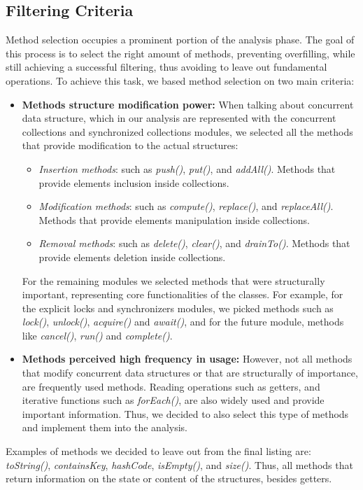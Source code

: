 \documentclass[]{usiinfthesis}
\begin{document}
\subsection{Filtering Criteria}
 Method selection occupies a prominent portion of the analysis phase. The goal of this process is to select the right amount of methods, preventing overfilling, while still achieving a successful filtering, thus avoiding to leave out fundamental operations. To achieve this task, we based method selection on two main criteria:
 \begin{itemize}
    \item \textbf{Methods structure modification power: } When talking about concurrent data structure, which in our analysis are represented with the concurrent collections and synchronized collections modules, we selected all the methods that provide modification to the actual structures:
    \begin{itemize}
        \item \textit{Insertion methods}: such as \textit{push()}, \textit{put()}, and \textit{addAll()}. Methods that provide elements inclusion inside collections.
        \item \textit{Modification methods}: such as \textit{compute()}, \textit{replace()}, and \textit{replaceAll()}. Methods that provide elements manipulation inside collections.
        \item \textit{Removal methods}: such as \textit{delete()}, \textit{clear()}, and \textit{drainTo()}. Methods that provide elements deletion inside collections.
    \end{itemize}
    For the remaining modules we selected methods that were structurally important, representing core functionalities of the classes. For example, for the explicit locks and synchronizers modules, we picked methods such as \textit{lock()}, \textit{unlock()}, \textit{acquire()} and \textit{await()}, and for the future module, methods like \textit{cancel()}, \textit{run()} and \textit{complete()}. 
    
    \item \textbf{Methods perceived high frequency in usage: }However, not all methods that modify concurrent data structures or that are structurally of importance, are frequently used methods. Reading operations such as getters, and iterative functions such as \textit{forEach()}, are also widely used and provide important information. Thus, we decided to also select this type of methods and implement them into the analysis. 
 \end{itemize}
 \noindent
 Examples of methods we decided to leave out from the final listing are: \textit{toString()}, \textit{containsKey}, \textit{hashCode}, \textit{isEmpty()}, and \textit{size()}. Thus, all methods that return information on the state or content of the structures, besides getters.
 
\end{document}
